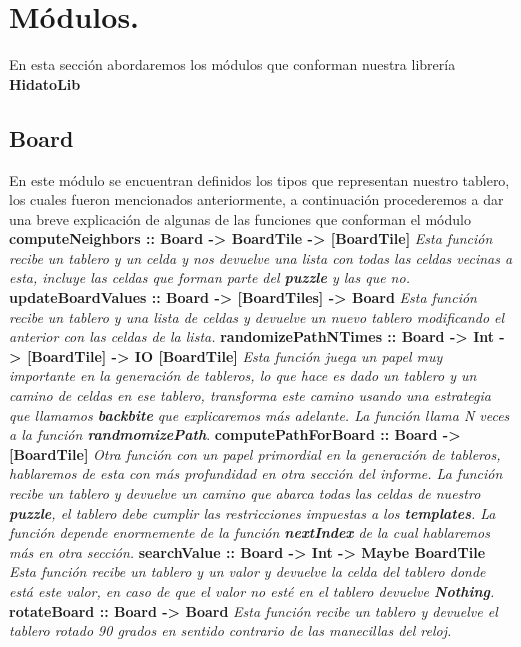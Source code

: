 \documentclass[12pt]{article}
\begin{document}
\section{M\'odulos.}
En esta secci\'on abordaremos los m\'odulos que conforman nuestra librer\'ia {\bf HidatoLib}
\subsection{Board}
En este m\'odulo se encuentran definidos los tipos que representan nuestro tablero, los cuales fueron mencionados anteriormente, a continuaci\'on procederemos a dar una breve
explicaci\'on de algunas de las funciones que conforman el m\'odulo
\newline \newline
{\bf computeNeighbors :: Board -> BoardTile -> [BoardTile]}\newline
{\it Esta funci\'on recibe un tablero y un celda y nos devuelve una lista con todas las celdas vecinas a esta, incluye las celdas que forman parte del {\bf puzzle} y las que no.}
\newline \newline
{\bf updateBoardValues :: Board -> [BoardTiles] -> Board}\newline
{\it Esta funci\'on recibe un tablero y una lista de celdas y devuelve un nuevo tablero modificando el anterior con las celdas de la lista.}
\newline \newline
{\bf randomizePathNTimes :: Board -> Int -> [BoardTile] -> IO [BoardTile]}\newline
{\it Esta funci\'on juega un papel muy importante en la generaci\'on de tableros, lo que hace es dado un tablero y un camino de celdas en ese tablero, transforma este camino usando una estrategia que llamamos {\bf backbite} que explicaremos
m\'as adelante. La funci\'on llama N veces a la funci\'on {\bf randmomizePath}}.
\newline \newline
{\bf computePathForBoard :: Board -> [BoardTile]}\newline
{\it Otra funci\'on con un papel primordial en la generaci\'on de tableros, hablaremos de esta con m\'as profundidad en otra secci\'on del informe. La funci\'on recibe un tablero y devuelve un camino que abarca todas las celdas de nuestro {\bf puzzle},
el tablero debe cumplir las restricciones impuestas a los {\bf templates}. La funci\'on depende enormemente de la funci\'on {\bf nextIndex} de la cual hablaremos m\'as en otra secci\'on.}
\newline \newline
{\bf searchValue :: Board -> Int -> Maybe BoardTile}\newline
{\it Esta funci\'on recibe un tablero y un valor y devuelve la celda del tablero donde est\'a este valor, en caso de que el valor no est\'e en el tablero devuelve {\bf Nothing}.}
\newline \newline
{\bf rotateBoard :: Board -> Board}\newline
{\it Esta funci\'on recibe un tablero y devuelve el tablero rotado 90 grados en sentido contrario de las manecillas del reloj.}
\end{document}
